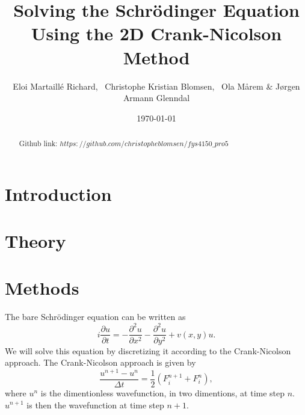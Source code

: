 \documentclass[english,notitlepage,reprint,nofootinbib]{revtex4-2}  %
\begin{document}
	
	\title{Solving the Schrödinger Equation Using the 2D Crank-Nicolson Method}  %
	\author{Eloi Martaillé Richard,
	\
	Christophe Kristian Blomsen,
	\
	Ola Mårem
	\&
	Jørgen Armann Glenndal
    }
	\date{\today}                             %
	\noaffiliation                            %
	
	\begin{abstract}
Github link: \href{https://github.com/christopheblomsen/fys4150_pro5}{$https://github.com/christopheblomsen/fys4150\_pro5$}
\end{abstract}
	\maketitle	
	
	
	\section{Introduction} \label{sec:introduction}


	\section{Theory} \label{sec:theory}
	
	
	
	
	\section{Methods}\label{sec:methods}
	The bare Schrödinger equation can be written as 
	\begin{equation}
		i \frac{\partial u}{\partial t} = -\frac{\partial^2 u}{\partial x^2} - \frac{\partial^2 u}{\partial y^2} + v(x,y) u.
	\end{equation}
	We will solve this equation by discretizing it according to the Crank-Nicolson approach. The Crank-Nicolson approach is given by 
	\begin{equation}
		\frac{u^{n+1}-u^{n}}{\Delta t} = \frac{1}{2}    \left(     F_i^{n+1} + F_i^n     \right),
	\end{equation}
	where $u^n$ is the dimentionless wavefunction, in two dimentions, at time step $n$. $u^{n+1}$ is then the wavefunction at time step $n+1$.
\end{document}
